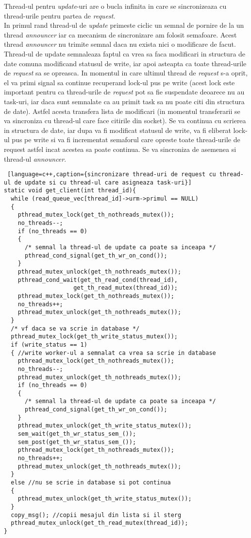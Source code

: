 \documentclass[runningheads]{llncs}
\begin{document}
Thread-ul pentru \textit{update}-uri are o bucla infinita in care se sincronizeaza cu thread-urile pentru partea de \textit{request}. \\ 
\indent In primul rand thread-ul de \textit{update} primeste ciclic un semnal de pornire de la un thread \textit{announcer} iar ca mecanism de sincronizare am folosit semafoare. Acest thread \textit{announcer} nu trimite semnal daca nu exista nici o modificare de facut. Thread-ul de update semnaleaza faptul ca vrea sa faca modificari in structura de date comuna modificand statusul de write, iar apoi asteapta ca toate thread-urile de \textit{request} sa se opreasca. In momentul in care ultimul thread de \textit{request} s-a oprit, el va primi signal sa continue recuperand lock-ul pus pe write (acest lock este important pentru ca thread-urile de \textit{request} pot sa fie suspendate deoarece nu au task-uri, iar daca sunt semnalate ca au primit task sa nu poate citi din structura de date). Astfel acesta transfera lista de modificari (in momentul transferarii se va sincroniza cu thread-ul care face citirile din socket). Se va continua cu scrierea in structura de date, iar dupa va fi modificat statusul de write, va fi eliberat lock-ul pus pe write si va fi incrementat semaforul care opreste toate thread-urile de request astfel incat acestea sa poate continua. Se va sincroniza de asemenea si thread-ul \textit{announcer}.


\clearpage
\begin{lstlisting} [language=c++,caption={sincronizare thread-uri de request cu thread-ul de update si cu thread-ul care asigneaza task-uri}]
static void get_client(int thread_id){
  while (read_queue_vec[thread_id]->urm->primul == NULL)
  {
    pthread_mutex_lock(get_th_nothreads_mutex());
    no_threads--;
    if (no_threads == 0)
    {
      /* semnal la thread-ul de update ca poate sa inceapa */
      pthread_cond_signal(get_th_wr_on_cond()); 
    }
    pthread_mutex_unlock(get_th_nothreads_mutex());
    pthread_cond_wait(get_th_read_cond(thread_id),
                    get_th_read_mutex(thread_id));
    pthread_mutex_lock(get_th_nothreads_mutex());
    no_threads++;
    pthread_mutex_unlock(get_th_nothreads_mutex());
  }
  /* vf daca se va scrie in database */
  pthread_mutex_lock(get_th_write_status_mutex());
  if (write_status == 1)
  { //write worker-ul a semnalat ca vrea sa scrie in database
    pthread_mutex_lock(get_th_nothreads_mutex());
    no_threads--;
    pthread_mutex_unlock(get_th_nothreads_mutex());
    if (no_threads == 0)
    {
      /* semnal la thread-ul de update ca poate sa inceapa */
      pthread_cond_signal(get_th_wr_on_cond()); 
    }
    pthread_mutex_unlock(get_th_write_status_mutex());
    sem_wait(get_th_wr_status_sem_());
    sem_post(get_th_wr_status_sem_());
    pthread_mutex_lock(get_th_nothreads_mutex());
    no_threads++;
    pthread_mutex_unlock(get_th_nothreads_mutex());
  }
  else //nu se scrie in database si pot continua
  {
    pthread_mutex_unlock(get_th_write_status_mutex());
  }
  copy_msg(); //copii mesajul din lista si il sterg
  pthread_mutex_unlock(get_th_read_mutex(thread_id));
}
\end{lstlisting}
\end{document}
